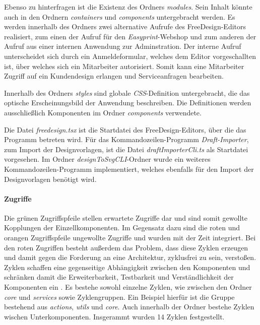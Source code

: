 Ebenso zu hinterfragen ist die Existenz des Ordners \textit{modules}. Sein Inhalt könnte auch in den Ordnern \textit{containers} und  \textit{components} untergebracht werden. Es werden innerhalb des Ordners zwei alternative Aufrufe des FreeDesign-Editors realisiert, zum einen der Aufruf für den \textit{Easyprint}-Webshop und zum anderen der Aufruf aus einer internen Anwendung zur Adminstration. Der interne Aufruf unterscheidet sich durch ein Anmeldeformular, welches dem Editor vorgeschallten ist, über welches sich ein Mitarbeiter autorisiert. Somit kann eine Mitarbeiter Zugriff auf ein Kundendesign erlangen und Serviceanfragen bearbeiten. 

Innerhalb des Ordners \textit{styles} sind globale \textit{CSS}-Definition untergebracht, die das optische Erscheinungsbild der Anwendung beschreiben. Die Definitionen werden ausschließlich Komponenten im Ordner \textit{components} verwendete. 


Die Datei \textit{freedesign.tsx} ist die Startdatei des FreeDesign-Editors, über die das Programm betreten wird. Für das Kommandozeilen-Programm \textit{Draft-Importer}, zum Import der Designvorlagen, ist die Datei \textit{draftImporterCli.ts} als Startdatei vorgesehen. Im Ordner \textit{designToSvgCLI}-Ordner wurde ein weiteres Kommandozeilen-Programm implementiert, welches ebenfalls für den Import der Designvorlagen benötigt wird.


\paragraph{Zugriffe}
Die grünen Zugriffspfeile stellen erwartete Zugriffe dar und sind somit gewollte Kopplungen der Einzellkomponenten. Im Gegensatz dazu sind die roten und orangen Zugriffspfeile ungewollte Zugriffe und wurden mit der Zeit integriert. Bei den roten Zugriffen besteht außerdem das Problem, dass diese Zyklen erzeugen und damit gegen die Forderung an eine Architektur, zyklusfrei zu sein, verstoßen. Zyklen schaffen eine gegenseitige Abhängigkeit zwischen den Komponenten und schränken damit die Erweiterbarkeit, Testbarkeit und Verständlichkeit der Komponenten ein \autocite[vgl.][88 - 90]{Lilienthal2019}. 
Es bestehe sowohl einzelne Zyklen, wie zwischen den Ordner \textit{core} und \textit{services} sowie Zyklengruppen. Ein Beispiel hierfür ist die Gruppe bestehend aus \textit{actions}, \textit{utils} und \textit{core}.
Auch innerhalb der Ordner bestehe Zyklen wischen Unterkomponenten. 
Insgerammt wurden 14 Zyklen festgestellt.

